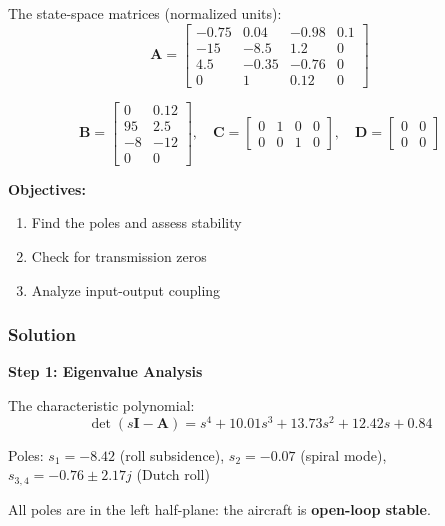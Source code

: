 The state-space matrices (normalized units):
\begin{equation}
\mathbf{A} = \begin{bmatrix} -0.75 & 0.04 & -0.98 & 0.1 \\ -15 & -8.5 & 1.2 & 0 \\ 4.5 & -0.35 & -0.76 & 0 \\ 0 & 1 & 0.12 & 0 \end{bmatrix}
\end{equation}

\begin{equation}
\mathbf{B} = \begin{bmatrix} 0 & 0.12 \\ 95 & 2.5 \\ -8 & -12 \\ 0 & 0 \end{bmatrix}, \quad
\mathbf{C} = \begin{bmatrix} 0 & 1 & 0 & 0 \\ 0 & 0 & 1 & 0 \end{bmatrix}, \quad
\mathbf{D} = \begin{bmatrix} 0 & 0 \\ 0 & 0 \end{bmatrix}
\end{equation}

\textbf{Objectives:}
\begin{enumerate}
\item Find the poles and assess stability
\item Check for transmission zeros
\item Analyze input-output coupling
\end{enumerate}

\subsubsection{Solution}

\textbf{Step 1: Eigenvalue Analysis}

The characteristic polynomial:
\begin{equation}
\det(s\mathbf{I} - \mathbf{A}) = s^4 + 10.01s^3 + 13.73s^2 + 12.42s + 0.84
\end{equation}

Poles: $s_1 = -8.42$ (roll subsidence), $s_2 = -0.07$ (spiral mode), $s_{3,4} = -0.76 \pm 2.17j$ (Dutch roll)

All poles are in the left half-plane: the aircraft is \textbf{open-loop stable}.

